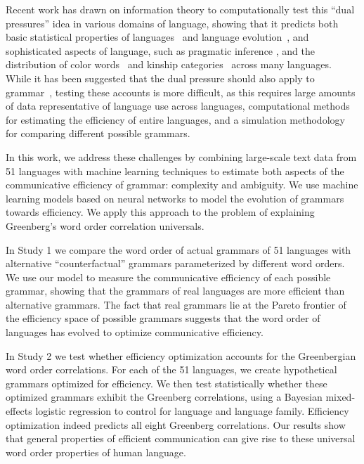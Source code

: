 \documentclass[9pt,twocolumn,twoside,lineno]{pnas-new}
\begin{document}
Recent work has drawn on information theory to computationally test this ``dual pressures'' idea in various domains of language, showing that it predicts
both basic statistical properties of languages~\cite{ferreri2003least,torre2019physical} and language evolution~\cite{kirby2015compression},
and sophisticated aspects of language, such as pragmatic inference \cite{frank2012predicting}, and the distribution of color words~\cite{zaslavsky2018efficient} and kinship categories~\cite{kemp2012kinship} across many languages.
While it has been suggested that the dual pressure should also apply to grammar~\cite{hawkins2004efficiency}, testing these accounts is more difficult, as this requires large amounts of data representative of language use across languages,  computational methods for estimating the efficiency of entire languages, and a simulation methodology for comparing different possible grammars.

In this work, we address these challenges by combining large-scale text data from 51 languages with machine learning techniques to estimate both aspects of the communicative efficiency of grammar: complexity and ambiguity.
We use machine learning models based on neural networks to model the evolution of grammars towards efficiency.
We apply this approach to the problem of explaining Greenberg's word order correlation universals.

In Study 1 we compare the word order of actual grammars of 51 languages with alternative ``counterfactual'' grammars parameterized by different word orders. We use our model to measure the communicative efficiency of each possible grammar, showing  that the grammars of real languages are more efficient than alternative grammars. The fact that real grammars lie at the Pareto frontier of the efficiency space of possible grammars suggests that the word order of languages has evolved to optimize communicative efficiency.

In Study 2 we test whether efficiency optimization accounts for the Greenbergian word order correlations.  For each of the 51 languages, we create hypothetical grammars optimized for efficiency.  We then test statistically whether these optimized grammars exhibit the Greenberg correlations, using a Bayesian mixed-effects logistic regression to control for language and language family.  Efficiency optimization indeed predicts all eight Greenberg correlations.
Our results show that general properties of efficient communication can give rise to these universal word order properties of human language.
\end{document}
